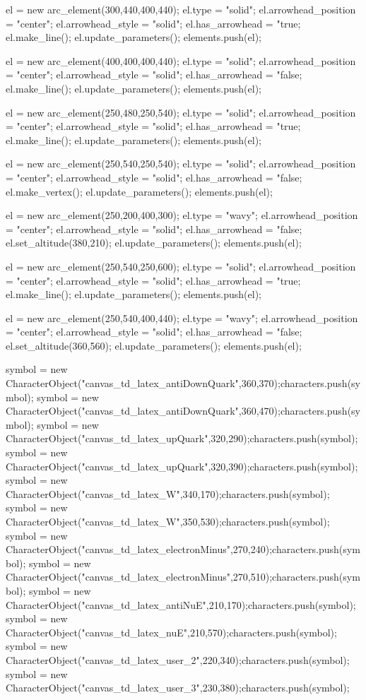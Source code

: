 el = new arc_element(300,440,400,440);
el.type = "solid";
el.arrowhead_position = "center";
el.arrowhead_style = "solid";
el.has_arrowhead = "true;
el.make_line();
el.update_parameters();
elements.push(el);

el = new arc_element(400,400,400,440);
el.type = "solid";
el.arrowhead_position = "center";
el.arrowhead_style = "solid";
el.has_arrowhead = "false;
el.make_line();
el.update_parameters();
elements.push(el);

el = new arc_element(250,480,250,540);
el.type = "solid";
el.arrowhead_position = "center";
el.arrowhead_style = "solid";
el.has_arrowhead = "true;
el.make_line();
el.update_parameters();
elements.push(el);

el = new arc_element(250,540,250,540);
el.type = "solid";
el.arrowhead_position = "center";
el.arrowhead_style = "solid";
el.has_arrowhead = "false;
el.make_vertex();
el.update_parameters();
elements.push(el);

el = new arc_element(250,200,400,300);
el.type = "wavy";
el.arrowhead_position = "center";
el.arrowhead_style = "solid";
el.has_arrowhead = "false;
el.set_altitude(380,210);
el.update_parameters();
elements.push(el);

el = new arc_element(250,540,250,600);
el.type = "solid";
el.arrowhead_position = "center";
el.arrowhead_style = "solid";
el.has_arrowhead = "true;
el.make_line();
el.update_parameters();
elements.push(el);

el = new arc_element(250,540,400,440);
el.type = "wavy";
el.arrowhead_position = "center";
el.arrowhead_style = "solid";
el.has_arrowhead = "false;
el.set_altitude(360,560);
el.update_parameters();
elements.push(el);

symbol = new CharacterObject("canvas_td_latex_antiDownQuark",360,370);characters.push(symbol);
symbol = new CharacterObject("canvas_td_latex_antiDownQuark",360,470);characters.push(symbol);
symbol = new CharacterObject("canvas_td_latex_upQuark",320,290);characters.push(symbol);
symbol = new CharacterObject("canvas_td_latex_upQuark",320,390);characters.push(symbol);
symbol = new CharacterObject("canvas_td_latex_W",340,170);characters.push(symbol);
symbol = new CharacterObject("canvas_td_latex_W",350,530);characters.push(symbol);
symbol = new CharacterObject("canvas_td_latex_electronMinus",270,240);characters.push(symbol);
symbol = new CharacterObject("canvas_td_latex_electronMinus",270,510);characters.push(symbol);
symbol = new CharacterObject("canvas_td_latex_antiNuE",210,170);characters.push(symbol);
symbol = new CharacterObject("canvas_td_latex_nuE",210,570);characters.push(symbol);
symbol = new CharacterObject("canvas_td_latex_user_2",220,340);characters.push(symbol);
symbol = new CharacterObject("canvas_td_latex_user_3",230,380);characters.push(symbol);